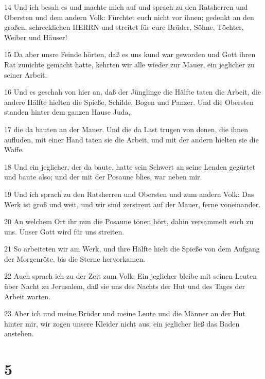 \par 14 Und ich besah es und machte mich auf und sprach zu den Ratsherren und Obersten und dem andern Volk: Fürchtet euch nicht vor ihnen; gedenkt an den großen, schrecklichen HERRN und streitet für eure Brüder, Söhne, Töchter, Weiber und Häuser!
\par 15 Da aber unsre Feinde hörten, daß es uns kund war geworden und Gott ihren Rat zunichte gemacht hatte, kehrten wir alle wieder zur Mauer, ein jeglicher zu seiner Arbeit.
\par 16 Und es geschah von hier an, daß der Jünglinge die Hälfte taten die Arbeit, die andere Hälfte hielten die Spieße, Schilde, Bogen und Panzer. Und die Obersten standen hinter dem ganzen Hause Juda,
\par 17 die da bauten an der Mauer. Und die da Last trugen von denen, die ihnen aufluden, mit einer Hand taten sie die Arbeit, und mit der andern hielten sie die Waffe.
\par 18 Und ein jeglicher, der da baute, hatte sein Schwert an seine Lenden gegürtet und baute also; und der mit der Posaune blies, war neben mir.
\par 19 Und ich sprach zu den Ratsherren und Obersten und zum andern Volk: Das Werk ist groß und weit, und wir sind zerstreut auf der Mauer, ferne voneinander.
\par 20 An welchem Ort ihr nun die Posaune tönen hört, dahin versammelt euch zu uns. Unser Gott wird für uns streiten.
\par 21 So arbeiteten wir am Werk, und ihre Hälfte hielt die Spieße von dem Aufgang der Morgenröte, bis die Sterne hervorkamen.
\par 22 Auch sprach ich zu der Zeit zum Volk: Ein jeglicher bleibe mit seinen Leuten über Nacht zu Jerusalem, daß sie uns des Nachts der Hut und des Tages der Arbeit warten.
\par 23 Aber ich und meine Brüder und meine Leute und die Männer an der Hut hinter mir, wir zogen unsere Kleider nicht aus; ein jeglicher ließ das Baden anstehen.

\chapter{5}

